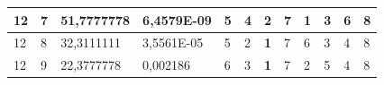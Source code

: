 \documentclass[conference]{IEEEtran}
\begin{document}
\begin{table}[]
\begin{tabular}{|llll|llllllll|}
\multicolumn{1}{|l|}{12}                                                    & \multicolumn{1}{l|}{7}                                                        & \multicolumn{1}{l|}{51,7777778}                                                   & 6,4579E-09                     & \multicolumn{1}{l|}{5}                                                  & \multicolumn{1}{l|}{4}                                                  & \multicolumn{1}{l|}{2}                                                  & \multicolumn{1}{l|}{7}                                                  & \multicolumn{1}{l|}{\textbf{1}}                                         & \multicolumn{1}{l|}{3}                                                  & \multicolumn{1}{l|}{6}                                                  & 8                          \\ \hline
\multicolumn{1}{|l|}{12}                                                    & \multicolumn{1}{l|}{8}                                                        & \multicolumn{1}{l|}{32,3111111}                                                   & 3,5561E-05                     & \multicolumn{1}{l|}{5}                                                  & \multicolumn{1}{l|}{2}                                                  & \multicolumn{1}{l|}{\textbf{1}}                                         & \multicolumn{1}{l|}{7}                                                  & \multicolumn{1}{l|}{6}                                                  & \multicolumn{1}{l|}{3}                                                  & \multicolumn{1}{l|}{4}                                                  & 8                          \\ \hline
\multicolumn{1}{|l|}{12}                                                    & \multicolumn{1}{l|}{9}                                                        & \multicolumn{1}{l|}{22,3777778}                                                   & 0,002186                       & \multicolumn{1}{l|}{6}                                                  & \multicolumn{1}{l|}{3}                                                  & \multicolumn{1}{l|}{\textbf{1}}                                         & \multicolumn{1}{l|}{7}                                                  & \multicolumn{1}{l|}{2}                                                  & \multicolumn{1}{l|}{5}                                                  & \multicolumn{1}{l|}{4}                                                  & 8                          \\ \hline

\end{tabular}
\end{table}
\end{document}
